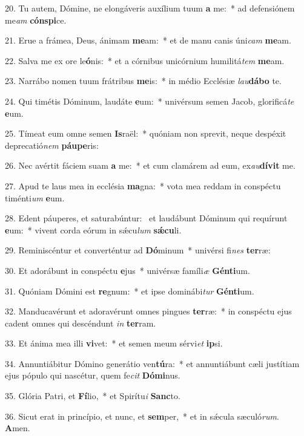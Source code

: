 20. Tu autem, Dómine, ne elongáveris auxílium tuum \textbf{a} me:~*  ad defensiónem me\textit{am} \textbf{cón}\textbf{spi}ce.\

21. Erue a frámea, Deus, ánimam \textbf{me}am:~*  et de manu canis úni\textit{cam} \textbf{me}am.\

22. Salva me ex ore le\textbf{ó}nis:~*  et a córnibus unicórnium humilitá\textit{tem} \textbf{me}am.\

23. Narrábo nomen tuum frátribus \textbf{me}is:~*  in médio Ecclésiæ \textit{lau}\textbf{dá}\textbf{bo} te.\

24. Qui timétis Dóminum, laudáte \textbf{e}um:~*  univérsum semen Jacob, glorificá\textit{te} \textbf{e}um.\

25. Tímeat eum omne semen \textbf{Is}raël:~*  quóniam non sprevit, neque despéxit deprecatió\textit{nem} \textbf{páu}\textbf{pe}ris:\

26. Nec avértit fáciem suam \textbf{a} me:~*  et cum clamárem ad eum, ex\textit{au}\textbf{dí}\textbf{vit} me.\

27. Apud te laus mea in ecclésia \textbf{ma}gna:~*  vota mea reddam in conspéctu timénti\textit{um} \textbf{e}um.\

28. Edent páuperes, et saturabúntur: \dag\  et laudábunt Dóminum qui requírunt \textbf{e}um:~*  vivent corda eórum in sǽcu\textit{lum} \textbf{sǽ}\textbf{cu}li.\

29. Reminiscéntur et converténtur ad \textbf{Dó}minum~*  univérsi fi\textit{nes} \textbf{ter}ræ:\

30. Et adorábunt in conspéctu \textbf{e}jus~*  univérsæ famíli\textit{æ} \textbf{Gén}\textbf{ti}um.\

31. Quóniam Dómini est \textbf{re}gnum:~*  et ipse dominábi\textit{tur} \textbf{Gén}\textbf{ti}um.\

32. Manducavérunt et adoravérunt omnes pingues \textbf{ter}ræ:~*  in conspéctu ejus cadent omnes qui descéndunt \textit{in} \textbf{ter}ram.\

33. Et ánima mea illi \textbf{vi}vet:~*  et semen meum sérvi\textit{et} \textbf{ip}si.\

34. Annuntiábitur Dómino generátio ven\textbf{tú}ra:~*  et annuntiábunt cæli justítiam ejus pópulo qui nascétur, quem fe\textit{cit} \textbf{Dó}\textbf{mi}nus.\

35. Glória Patri, et \textbf{Fí}lio,~*  et Spirítu\textit{i} \textbf{Sanc}to.\

36. Sicut erat in princípio, et nunc, et \textbf{sem}per,~*  et in sǽcula sæculó\textit{rum}. \textbf{A}men.\

